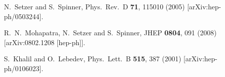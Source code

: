 \documentclass[prd,aps,preprint,tightenlines,superscriptaddress]{revtex4}
\begin{document}
\begin{thebibliography}
N.~Setzer and S.~Spinner,
  Phys.\ Rev.\  D {\bf 71}, 115010 (2005)
  [arXiv:hep-ph/0503244].

  R.~N.~Mohapatra, N.~Setzer and S.~Spinner,
  JHEP {\bf 0804}, 091 (2008)
  [arXiv:0802.1208 [hep-ph]].

  S.~Khalil and O.~Lebedev,
  Phys.\ Lett.\  B {\bf 515}, 387 (2001)
  [arXiv:hep-ph/0106023].


\end{thebibliography}
\end{document}
